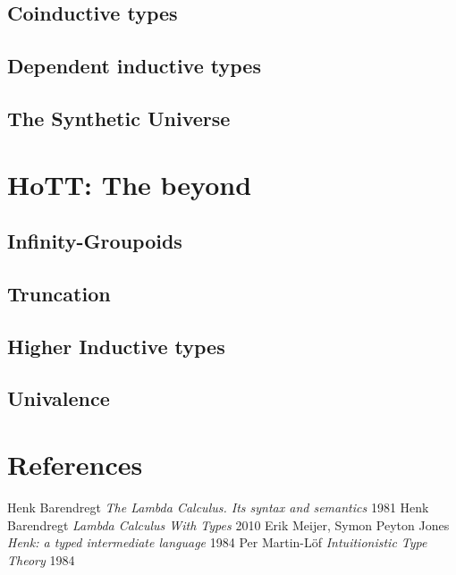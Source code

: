 \documentclass[11pt,oneside]{article}
\begin{document}
\subsection{Coinductive types}
\subsection{Dependent inductive types}
\subsection{The Synthetic Universe}

\section{HoTT: The beyond}
\subsection{Infinity-Groupoids}
\subsection{Truncation}
\subsection{Higher Inductive types}
\subsection{Univalence}

\newpage
\section{References}
\begin{thebibliography}{9}

      Henk Barendregt \textit{The Lambda Calculus. Its syntax and semantics} 1981
      Henk Barendregt \textit{Lambda Calculus With Types} 2010
       Erik Meijer, Symon Peyton Jones \textit{Henk: a typed intermediate language} 1984
        Per Martin-Löf \textit{Intuitionistic Type Theory} 1984

\end{thebibliography}
\end{document}
